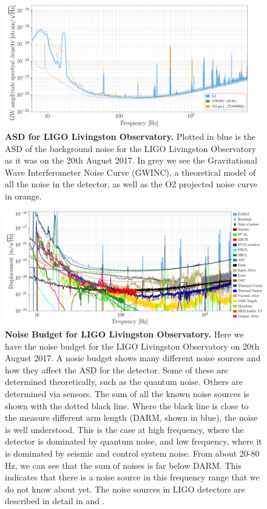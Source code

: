 \documentclass[11pt]{cuthesis}
\begin{document}
\begin{figure}[ht]
\centering
\includegraphics[width=16cm]{L1-ASD-20170820.png} 
\caption{\textbf{ASD for LIGO Livingston Observatory.} Plotted in blue is the ASD of the background noise for the LIGO Livingston Observatory as it was on the 20th August 2017. In grey we see the Gravitational Wave Interferometer Noise Curve (GWINC), a theoretical model of all the noise in the detector, as well as the O2 projected noise curve in orange. }
\label{fig:asd}
\end{figure}

\begin{landscape}
\begin{figure}[ht]
\centering
\includegraphics[width=22cm]{L1-NOISE_BUDGET-20170820.png} 
\caption{\textbf{Noise Budget for LIGO Livingston Observatory.} Here we have the noise budget for the LIGO Livingston Observatory on 20th August 2017. A nosie budget shows many different noise sources and how they affect the ASD for the detector. Some of these are determined theoretically, such as the quantum noise. Others are determined via sensors. The sum of all the known noise sources is shown with the dotted black line. Where the black line is close to the measure different arm length (DARM, shown in blue), the noise is well understood. This is the case at high frequency, where the detector is dominated by quantum noise, and low frequency, where it is dominated by seismic and control system noise. From about 20-80 Hz, we can see that the sum of noises is far below DARM. This indicates that there is a noise source in this frequency range that we do not know about yet. The noise sources in LIGO detectors are described in detail in \cite{noise_budget_martynov} and \cite{GW150914-detector}.}
\label{fig:noise budget}
\end{figure}
\end{landscape}
\end{document}

